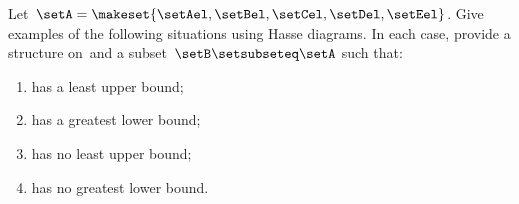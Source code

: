 \begin{gradedexercise}
    \label{ex:UpperLowerBounds}
    Let~$\setA = \makeset{\setAel, \setBel, \setCel, \setDel, \setEel }$.
    Give examples of the following situations using Hasse diagrams.
    In each case, provide a  structure on~\setA and a subset~$\setB \setsubseteq \setA$ such that:
    \begin{enumerate}
        \item \setB has a least upper bound;
        \item \setB has a greatest lower bound;
        \item \setB has no least upper bound;
        \item \setB has no greatest lower bound.
    \end{enumerate}
\end{gradedexercise}

